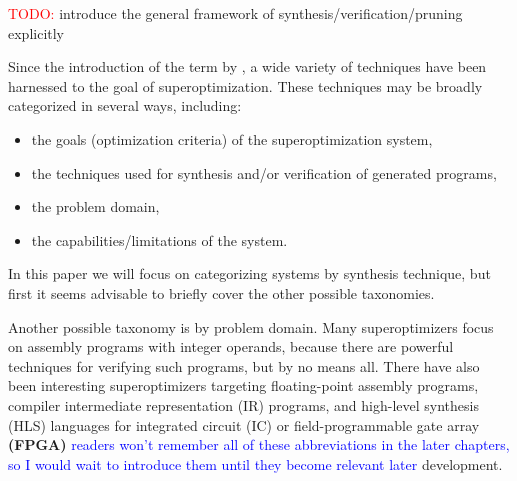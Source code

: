 \documentclass[12pt,twoside]{reedthesis}
\newcommand{\red}[1]{\textcolor{red}{#1}}
\newcommand{\comment}[2]{\textbf{#1} \textcolor{blue}{#2}}
\begin{document}
    \red{TODO:} introduce the general framework of synthesis/verification/pruning explicitly
    
    Since the introduction of the term by \cite{massalin1987superoptimizer}, a wide variety of techniques have been harnessed to the goal of superoptimization.
    These techniques may be broadly categorized in several ways, including:
        \begin{itemize}
            \item the goals (optimization criteria) of the superoptimization system,
            \item the techniques used for synthesis and/or verification of generated programs,
            \item the problem domain,
            \item the capabilities/limitations of the system.
        \end{itemize}
    In this paper we will focus on categorizing systems by synthesis technique, but first it seems advisable to briefly cover the other possible taxonomies.
    
    Another possible taxonomy is by problem domain.
    Many superoptimizers focus on assembly programs with integer operands, because there are powerful techniques for verifying such programs, but by no means all.
    There have also been interesting superoptimizers targeting 
        floating-point assembly programs, 
        compiler intermediate representation (IR) programs, 
        and high-level synthesis (HLS) languages for integrated circuit (IC) or field-programmable gate array \comment{(FPGA)}{readers won't remember all of these abbreviations in the later chapters, so I would wait to introduce them until they become relevant later} development.
    
\end{document}
